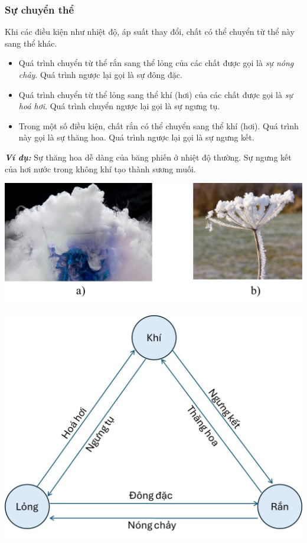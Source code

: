 \begin{tomtat}
\subsubsection{Sự chuyển thể}
\begin{dn}
	Khi các điều kiện như nhiệt độ, áp suất thay đổi, chất có thể chuyển từ thể này sang thể khác.
	\begin{itemize}
		\item Quá trình chuyển từ thể rắn sang thể lỏng của các chất được gọi là \textit{sự nóng chảy}. Quá trình ngược lại gọi là sự đông đặc.
		\item Quá trình chuyển từ thể lỏng sang thể khí (hơi) của các chất được gọi là \textit{sự hoá hơi}. Quá trình chuyển ngược lại gọi là sự ngưng tụ.
		\item Trong một số điều kiện, chất rắn có thể chuyển sang thể khí (hơi). Quá trình này gọi là sự thăng hoa. Quá trình ngược lại gọi là sự ngưng kết.\\
	\end{itemize}
\end{dn}
	\textit{\textbf{Ví dụ:}} Sự thăng hoa dễ dàng của băng phiến ở nhiệt độ thường. Sự ngưng kết của hơi nước trong không khí tạo thành sương muối.
	\begin{center}
		\includegraphics[width=0.7\linewidth]{figs/VN12-Y24-PH-SYL-001-7}
	\end{center}

\begin{center}
	\includegraphics[width=0.5\linewidth]{figs/VN12-Y24-PH-SYL-001-4}
\end{center}

\end{tomtat}
